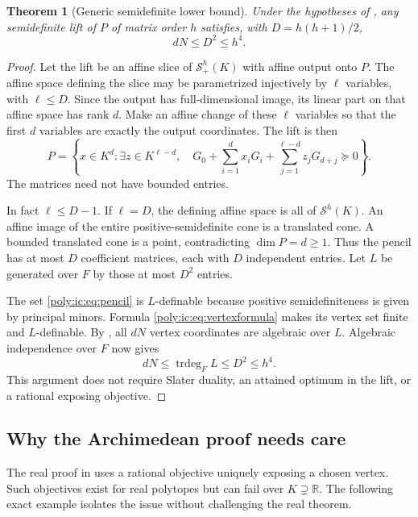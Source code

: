 \documentclass[11pt,a4paper]{article}
\numberwithin{equation}{section}
\newtheorem{theorem}{Theorem}[section]
\theoremstyle{plain}
\newcommand{\R}{\mathbb R}
\newcommand{\trdeg}{\operatorname{trdeg}}
\newcommand{\Sym}{\mathcal S}
\begin{document}
\begin{theorem}[Generic semidefinite lower bound]\label{poly:ic:thm:genericpsd}
Under the hypotheses of , any semidefinite lift of $P$
of matrix order $h$ satisfies, with $D=h(h+1)/2$,
\begin{equation}\label{poly:ic:eq:genericpsd}
 dN\leq D^2\leq h^4.
\end{equation}
\end{theorem}
\begin{proof}
Let the lift be an affine slice of $\Sym^h_+(K)$ with affine output onto
$P$. The affine space defining the slice may be parametrized injectively
by $\ell$ variables, with $\ell\leq D$. Since the output has
full-dimensional image, its linear part on that affine space has rank
$d$. Make an affine change of these $\ell$ variables so that the first
$d$ variables are exactly the output coordinates. The lift is then
\begin{equation}\label{poly:ic:eq:pencil}
 P=\left\{x\in K^d:\exists z\in K^{\ell-d},\quad
 G_0+\sum_{i=1}^{d}x_iG_i+
             \sum_{j=1}^{\ell-d}z_jG_{d+j}\succeq0\right\}.
\end{equation}
The matrices need not have bounded entries.

In fact $\ell\leq D-1$. If $\ell=D$, the defining affine space is all
of $\Sym^h(K)$. An affine image of the entire positive-semidefinite cone
is a translated cone. A bounded translated cone is a point, contradicting
$\dim P=d\geq1$. Thus the pencil has at most $D$ coefficient matrices,
each with $D$ independent entries. Let $L$ be generated over $F$ by those
at most $D^2$ entries.

The set \eqref{poly:ic:eq:pencil} is $L$-definable because positive
semidefiniteness is given by principal minors. Formula
\eqref{poly:ic:eq:vertexformula} makes its vertex set finite and $L$-definable.
By , all $dN$ vertex coordinates are algebraic over $L$.
Algebraic independence over $F$ now gives
\[
 dN\leq\trdeg_F L\leq D^2\leq h^4.
\]
This argument does not require Slater duality, an attained optimum in
the lift, or a rational exposing objective.
\end{proof}

\subsection{Why the Archimedean proof needs care}
The real proof in \cite[Theorem 2.1]{ic:grt} uses a rational objective uniquely
exposing a chosen vertex. Such objectives exist for real polytopes but
can fail over $K\supsetneq\R$. The following exact example isolates the
issue without challenging the real theorem.
\end{document}

